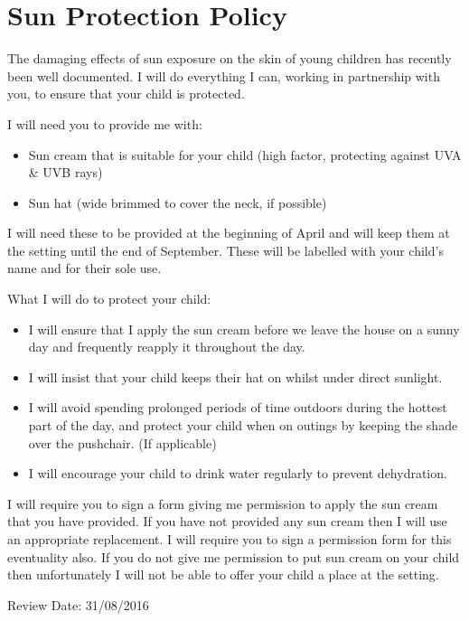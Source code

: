 

\section{Sun Protection Policy}

The damaging effects of sun exposure on the skin of young children has recently been well documented. I will do everything I can, working in partnership with you, to ensure that your child is protected.

I will need you to provide me with:
\begin{itemize}
\item Sun cream that is suitable for your child (high factor, protecting against UVA & UVB rays)
\item Sun hat (wide brimmed to cover the neck, if possible)
\end{itemize}

I will need these to be provided at the beginning of April and will keep them at the setting until the end of September. These will be labelled with your child's name and for their sole use.

What I will do to protect your child:

\begin{itemize}
\item I will ensure that I apply the sun cream before we leave the house on a sunny day and frequently reapply it throughout the day. 
\item I will insist that your child keeps their hat on whilst under direct sunlight. 
\item I will avoid spending prolonged periods of time outdoors during the hottest part of the day, and protect your child when on outings by keeping the shade over the pushchair. (If applicable) 
\item I will encourage your child to drink water regularly to prevent dehydration. 
\end{itemize}

I will require you to sign a form giving me permission to apply the sun cream that you have provided. If you have not provided any sun cream then I will use an appropriate replacement. I will require you to sign a permission form for this eventuality also. If you do not give me permission to put sun cream on your child then unfortunately I will not be able to offer your child a place at the setting.

Review Date: 31/08/2016


